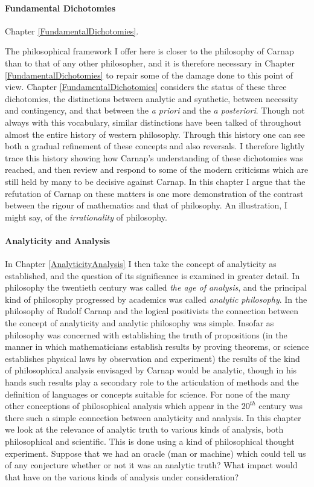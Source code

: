 \paragraph{Fundamental Dichotomies}

Chapter \ref{FundamentalDichotomies}.

The philosophical framework I offer here is closer to the philosophy
of Carnap than to that of any other philosopher, and it is therefore
necessary in Chapter \ref{FundamentalDichotomies} to repair some of
the damage done to this point of view.
Chapter \ref{FundamentalDichotomies} considers the status of these three dichotomies, the
distinctions between analytic and synthetic, between necessity and
contingency, and that between the \emph{a priori} and the \emph{a posteriori}.
Though not always with this vocabulary, similar distinctions have been
talked of throughout almost the entire history of western philosophy.
Through this history one can see both a gradual refinement of these
concepts and also reversals.
I therefore lightly trace this history showing how Carnap's
understanding of these dichotomies was reached, and then review and
respond to some of the modern criticisms which are still held by many
to be decisive against Carnap.
In this chapter I argue that the refutation of Carnap on these matters
is one more demonstration of the contrast between the rigour of
mathematics and that of philosophy.
An illustration, I might say, of the \emph{irrationality} of philosophy.

\paragraph{Analyticity and Analysis}

In Chapter \ref{AnalyticityAnalysis} I then take the concept of
analyticity as established, and the question of its significance is
examined in greater detail. 
In philosophy the twentieth century was called \emph{the age of
  analysis}, and the principal kind of philosophy progressed by
academics was called \emph{analytic philosophy}. 
In the philosophy of Rudolf Carnap and the logical positivists the
connection between the concept of analyticity and analytic philosophy
was simple. 
Insofar as philosophy was concerned with establishing the truth of
propositions (in the manner in which mathematicians establish results
by proving theorems, or science establishes physical laws by
observation and experiment) the results of the kind of philosophical
analysis envisaged by Carnap would be analytic, though in his hands
such results play a secondary role to the articulation of methods and
the definition of languages or concepts suitable for science. 
For none of the many other conceptions of philosophical analysis which
appear in the $20^{th}$ century was there such a simple connection
between analyticity and analysis. 
In this chapter we look at the relevance of analytic truth to various
kinds of analysis, both philosophical and scientific. 
This is done using a kind of philosophical thought experiment.
Suppose that we had an oracle (man or machine) which could tell us of
any conjecture whether or not it was an analytic truth? 
What impact would that have on the various kinds of analysis under
consideration?

